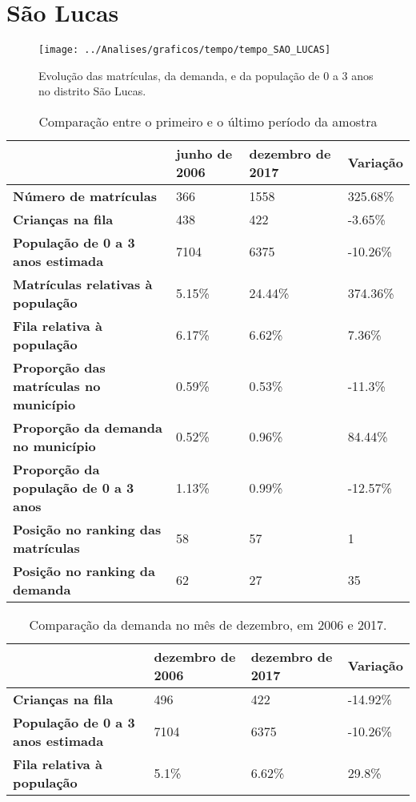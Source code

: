 \section{São Lucas}
\begin{figure}[H]
\centering
\texttt{[image: ../Analises/graficos/tempo/tempo\_SAO\_LUCAS]}
\caption{Evolução das matrículas, da demanda, e da população de 0 a 3 anos no distrito São Lucas.}
\end{figure}
\begin{table}[H]
\begin{tabular}{|l|l|l|l|}
\hline
\textbf{}                                      & \textbf{junho de 2006}       & \textbf{dezembro de 2017}    & \textbf{Variação} \\ \hline
\textbf{Número de matrículas}                  & 366 & 1558 & 325.68\% \\ \hline
\textbf{Crianças na fila}                      & 438 & 422 & -3.65\% \\ \hline
\textbf{População de 0 a 3 anos estimada}      & 7104 & 6375 & -10.26\% \\ \hline
\textbf{Matrículas relativas à população}      & 5.15\% & 24.44\% & 374.36\% \\ \hline
\textbf{Fila relativa à população}             & 6.17\% & 6.62\% & 7.36\% \\ \hline
\textbf{Proporção das matrículas no município} & 0.59\% & 0.53\% & -11.3\% \\ \hline
\textbf{Proporção da demanda no município}     & 0.52\% & 0.96\% & 84.44\% \\ \hline
\textbf{Proporção da população de 0 a 3 anos}  & 1.13\% & 0.99\% & -12.57\% \\ \hline
\textbf{Posição no ranking das matrículas}     & 58 & 57 & 1 \\ \hline
\textbf{Posição no ranking da demanda}         & 62 & 27 & 35 \\ \hline
\end{tabular}
\caption{Comparação entre o primeiro e o último período da amostra}
\end{table}
\begin{table}[H]
\begin{tabular}{|l|l|l|l|}
\hline
\textbf{}                                 & \textbf{dezembro de 2006} & \textbf{dezembro de 2017} & \textbf{Variação} \\ \hline
\textbf{Crianças na fila}                      & 496 & 422 & -14.92\% \\ \hline
\textbf{População de 0 a 3 anos estimada}      & 7104 & 6375 & -10.26\% \\ \hline
\textbf{Fila relativa à população}             & 5.1\% & 6.62\% & 29.8\% \\ \hline
\end{tabular}
\caption{Comparação da demanda no mês de dezembro, em 2006 e 2017.}
\end{table}
